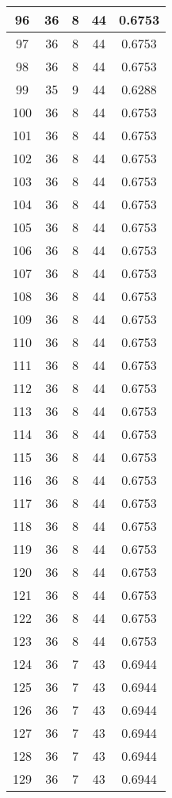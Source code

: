 \documentclass[letterpaper, 12pt]{article}
\begin{document}
\begin{longtable}{|c|c|c|c|c|}
\hline
96 & 36 & 8 & 44 & 0.6753 \\
\hline
97 & 36 & 8 & 44 & 0.6753 \\
\hline
98 & 36 & 8 & 44 & 0.6753 \\
\hline
99 & 35 & 9 & 44 & 0.6288 \\
\hline
100 & 36 & 8 & 44 & 0.6753 \\
\hline
101 & 36 & 8 & 44 & 0.6753 \\
\hline
102 & 36 & 8 & 44 & 0.6753 \\
\hline
103 & 36 & 8 & 44 & 0.6753 \\
\hline
104 & 36 & 8 & 44 & 0.6753 \\
\hline
105 & 36 & 8 & 44 & 0.6753 \\
\hline
106 & 36 & 8 & 44 & 0.6753 \\
\hline
107 & 36 & 8 & 44 & 0.6753 \\
\hline
108 & 36 & 8 & 44 & 0.6753 \\
\hline
109 & 36 & 8 & 44 & 0.6753 \\
\hline
110 & 36 & 8 & 44 & 0.6753 \\
\hline
111 & 36 & 8 & 44 & 0.6753 \\
\hline
112 & 36 & 8 & 44 & 0.6753 \\
\hline
113 & 36 & 8 & 44 & 0.6753 \\
\hline
114 & 36 & 8 & 44 & 0.6753 \\
\hline
115 & 36 & 8 & 44 & 0.6753 \\
\hline
116 & 36 & 8 & 44 & 0.6753 \\
\hline
117 & 36 & 8 & 44 & 0.6753 \\
\hline
118 & 36 & 8 & 44 & 0.6753 \\
\hline
119 & 36 & 8 & 44 & 0.6753 \\
\hline
120 & 36 & 8 & 44 & 0.6753 \\
\hline
121 & 36 & 8 & 44 & 0.6753 \\
\hline
122 & 36 & 8 & 44 & 0.6753 \\
\hline
123 & 36 & 8 & 44 & 0.6753 \\
\hline
124 & 36 & 7 & 43 & 0.6944 \\
\hline
125 & 36 & 7 & 43 & 0.6944 \\
\hline
126 & 36 & 7 & 43 & 0.6944 \\
\hline
127 & 36 & 7 & 43 & 0.6944 \\
\hline
128 & 36 & 7 & 43 & 0.6944 \\
\hline
129 & 36 & 7 & 43 & 0.6944 \\

\end{longtable}
\end{document}
